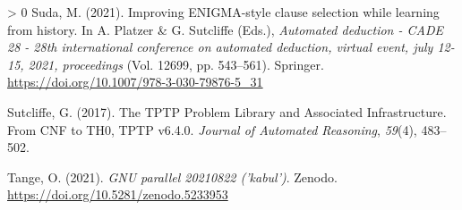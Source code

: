 \documentclass[10pt,a4paper,onecolumn]{article}
\newlength{\cslhangindent}
\newenvironment{CSLReferences}[3] %
 {%
  \setlength{\parindent}{0pt}
  \ifodd #1 \everypar{\setlength{\hangindent}{\cslhangindent}}\ignorespaces\fi
  \ifnum #2 > 0
  \setlength{\parskip}{#2\baselineskip}
  \fi
 }%
 {}
\begin{document}
\begin{CSLReferences}{1}{0}
\leavevmode\hypertarget{ref-DBLP:confux2fcadeux2f000121a}{}%
Suda, M. (2021). Improving ENIGMA-style clause selection while learning
from history. In A. Platzer \& G. Sutcliffe (Eds.), \emph{Automated
deduction - {CADE} 28 - 28th international conference on automated
deduction, virtual event, july 12-15, 2021, proceedings} (Vol. 12699,
pp. 543--561). Springer.
\url{https://doi.org/10.1007/978-3-030-79876-5_31}

\leavevmode\hypertarget{ref-Sut17}{}%
Sutcliffe, G. (2017). {The TPTP Problem Library and Associated
Infrastructure. From CNF to TH0, TPTP v6.4.0}. \emph{Journal of
Automated Reasoning}, \emph{59}(4), 483--502.

\leavevmode\hypertarget{ref-tange_2021_5233953}{}%
Tange, O. (2021). \emph{GNU parallel 20210822 ('kabul')}. Zenodo.
\url{https://doi.org/10.5281/zenodo.5233953}

\end{CSLReferences}
\end{document}
